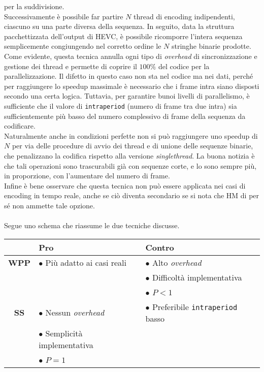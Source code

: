 per la suddivisione.\\
Successivamente è possibile far partire $N$ thread di encoding 
indipendenti, ciascuno su una parte diversa della sequenza. In seguito, data la 
struttura 
pacchettizzata dell'output di HEVC, è possibile ricomporre l'intera 
sequenza semplicemente congiungendo nel corretto ordine le $N$ stringhe binarie 
prodotte. \\
Come evidente, questa tecnica annulla ogni tipo di \emph{overhead} di 
sincronizzazione e gestione dei thread e permette di coprire il $100\%$ del 
codice per la parallelizzazione. Il difetto in questo caso non sta nel codice 
ma nei dati, perché per raggiungere lo speedup massimale è necessario che i 
frame intra siano disposti secondo una certa logica. Tuttavia, per garantire 
bunoi livelli di parallelismo, è sufficiente che il valore di 
\verb|intraperiod| (numero di frame tra due intra) sia sufficientemente più 
basso del numero complessivo di frame della sequenza da codificare. \\
Naturalmente anche in condizioni perfette non si può raggiungere uno speedup di 
$N$ per via delle procedure di avvio dei thread e di
unione delle sequenze binarie, che penalizzano la codifica 
rispetto alla versione \emph{singlethread}. La buona 
notizia è che tali operazioni sono trascurabili già con sequenze corte, e lo 
sono sempre più, in proporzione, con l'aumentare del numero di frame.\\
Infine è bene osservare che questa tecnica non può essere applicata 
nei casi di encoding in tempo reale, anche se ciò diventa secondario se si nota 
che HM di per sé non ammette tale opzione.
\\ \\
Segue uno schema che riassume le due tecniche discusse.

\begin{table}[H]
  \centering
  \begin{tabular}{|c|l|l|}
    \hline
    
    & 
    \textbf{Pro} & 
    \textbf{Contro} \\
    
    \hline
    \hline
    \hline
    
    \textbf{WPP} &
    $\bullet$ Più adatto ai casi reali &
    $\bullet$ Alto \emph{overhead} \\
    
    &
    &
    $\bullet$ Difficoltà implementativa \\
    
    &
    &
    $\bullet$ $P < 1$ \\
    
    \hline
    
    \textbf{SS} &
    $\bullet$ Nessun \emph{overhead} &
    $\bullet$ Preferibile \verb|intraperiod| basso \\
    
    &
    $\bullet$ Semplicità implementativa &
    \\
    
    &
    $\bullet$ $P = 1$ &
    \\
    
    \hline
  \end{tabular}
\end{table}

